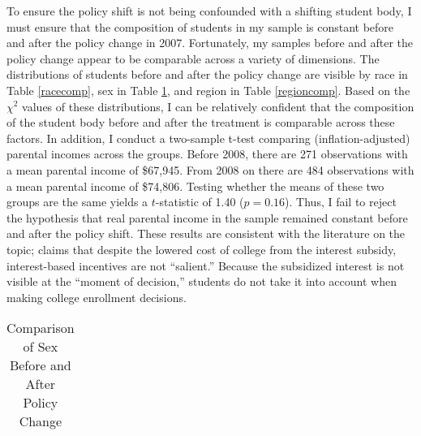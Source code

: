 \documentclass[12pt]{article}
\begin{document}
	To ensure the policy shift is not being confounded with a shifting student body, I must ensure that the composition of students in my sample is constant before and after the policy change in 2007. Fortunately, my samples before and after the policy change appear to be comparable across a variety of dimensions. The distributions of students before and after the policy change are visible by race in Table \ref{racecomp}, sex in Table \ref{sexcomp}, and region in Table \ref{regioncomp}. Based on the $\chi^2$ values of these distributions, I can be relatively confident that the composition of the student body before and after the treatment is comparable across these factors. In addition, I conduct a two-sample t-test comparing (inflation-adjusted) parental incomes across the groups. Before 2008, there are 271 observations with a mean parental income of \$67,945. From 2008 on there are 484 observations with a mean parental income of \$74,806. Testing whether the means of these two groups are the same yields a $t$-statistic of 1.40 ($p = 0.16$). Thus, I fail to reject the hypothesis that real parental income in the sample remained constant before and after the policy shift. These results are consistent with the literature on the topic; \textcite{dynarski2015} claims that despite the lowered cost of college from the interest subsidy, interest-based incentives are not ``salient.'' Because the subsidized interest is not visible at the ``moment of decision,'' students do not take it into account when making college enrollment decisions. 
	
{
	\begin{table}
		\centering
		\caption{Comparison of Race Before and After Policy Change}
		\label{racecomp}
	\end{table}

	\begin{table}
		\small
		\centering
		\caption{Comparison of Sex Before and After Policy Change}
		\begin{tabular}{lrrrrrr}
			
		\end{tabular}
		\label{sexcomp}
	\end{table}

	\begin{table}
		\centering
		\caption{Comparison of Region Before and After Policy Change}
		\label{regioncomp}
	\end{table}
}
	
\end{document}
